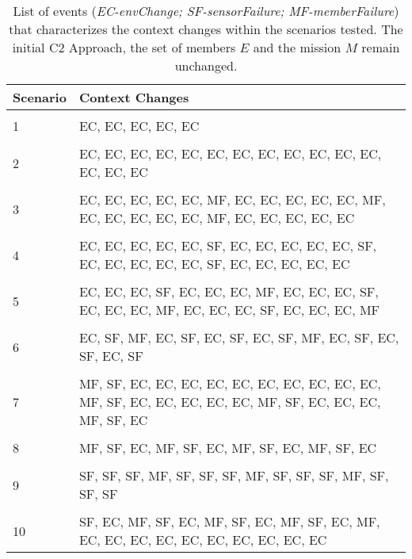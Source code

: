 \begin{table}[ht]
\centering
\fontsize{9}{9}
\selectfont
\caption{List of events (\textit{EC-envChange; SF-sensorFailure; MF-memberFailure}) that characterizes the context changes within the scenarios tested. The initial C2 Approach, the set of members $E$ and the mission $M$ remain unchanged.}
\label{tab:scenarios}
\begin{tabular}{|m{}|m{}|}
\hline
\rowcolor{lightgray}
 \textbf {Scenario} & \hfil  \textbf {Context Changes} \\
\hline  & \\[-1.5ex]
\hfil 1 & EC, EC, EC, EC, EC \\[1ex]
\hline  & \\[-1.5ex]
\hfil 2 & EC, EC, EC, EC, EC, EC, EC, EC, EC, EC, EC, EC, EC, EC, EC \\[1ex]
\hline & \\[-1.5ex]
\hfil 3 & 
EC, EC, EC, EC, EC, MF, EC, EC, EC, EC, EC, MF, EC, EC, EC, EC, EC, MF, EC, EC, EC, EC, EC  \\[1ex]
\hline & \\[-1.5ex]
\hfil 4 & EC, EC, EC, EC, EC, SF, EC, EC, EC, EC, EC, SF, EC, EC, EC, EC, EC, SF, EC, EC, EC, EC, EC  \\[1ex]
\hline & \\[-1.5ex]
 \hfil 5 & EC, EC, EC, SF, EC, EC, EC, MF, EC, EC, EC, SF, EC, EC, EC, MF, EC, EC, EC, SF, EC, EC, EC, MF  \\[1ex]
\hline & \\[-1.5ex]
 \hfil 6 & EC, SF, MF, EC, SF, EC, SF, EC, SF, MF, EC, SF, EC, SF, EC, SF \\[1ex]
\hline & \\[-1.5ex]
 \hfil 7 & MF, SF, EC, EC, EC, EC, EC, EC, EC, EC, EC, EC, MF, SF, EC, EC, EC, EC, EC, MF, SF, EC, EC, EC, MF, SF, EC \\[1ex]
 \hline & \\[-1.5ex]
 \hfil 8 & MF, SF, EC, MF, SF, EC, MF, SF, EC, MF, SF, EC \\[1.5ex]
 \hline & \\[-1.5ex] 
 \hfil 9 & SF, SF, SF, MF, SF, SF, SF, MF, SF, SF, SF, MF, SF, SF, SF \\[1ex]
 \hline & \\[-1.5ex] 
 \hfil 10 & SF, EC, MF, SF, EC, MF, SF, EC, MF, SF, EC, MF, EC, EC, EC, EC, EC, EC, EC, EC, EC, EC \\[1ex]
 \hline
\end{tabular}

\end{table}
